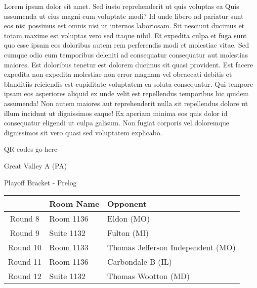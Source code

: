 \documentclass{article}%
\begin{document}
\vspace*{8pt}%
\linebreak%
\newline%
\newline%
Lorem ipsum dolor sit amet. Sed iusto reprehenderit ut quis voluptas ea Quis assumenda ut eius magni eum voluptate modi? Id unde libero ad pariatur sunt eos nisi possimus est omnis nisi ut internos laboriosam. Sit nesciunt ducimus et totam maxime est voluptas vero sed itaque nihil. Et expedita culpa et fuga sunt quo esse ipsam eos doloribus autem rem perferendis modi et molestiae vitae.\newline%
\newline%
Sed cumque odio eum temporibus deleniti ad consequatur consequatur aut molestias maiores. Est doloribus tenetur est dolorem ducimus sit quasi provident. Est facere expedita non expedita molestiae non error magnam vel obcaecati debitis et blanditiis reiciendis est cupiditate voluptatem ea soluta consequatur. Qui tempore ipsam eos asperiores aliquid ex unde velit est repellendus temporibus hic quidem assumenda!\newline%
\newline%
Non autem maiores aut reprehenderit nulla sit repellendus dolore ut illum incidunt ut dignissimos eaque! Ex aperiam minima eos quis dolor id consequatur eligendi ut culpa galisum. Non fugiat corporis vel doloremque dignissimos sit vero quasi sed voluptatem explicabo.\newline%
\newline%
%
\vspace*{30pt}%
\begin{center}%
\begin{Huge}%
QR codes go here%
\end{Huge}%
\end{center}%
\newpage%
\begin{center}%
\begin{Huge}%
Great Valley A (PA)%
\end{Huge}%
\vspace*{8pt}%
\linebreak%
\begin{Large}%
Playoff Bracket {-} Prelog%
\end{Large}%
\end{center}%
%
\begin{tabularx}{\textwidth}{|c|Y|Y|}%
\hline%
&Room Name&Opponent\\%
\hline%
Round 8&Room 1136&Eldon (MO)\\%
Round 9&Suite 1132&Fulton (MI)\\%
Round 10&Room 1133&Thomas Jefferson Independent (MO)\\%
Round 11&Room 1136&Carbondale B (IL)\\%
Round 12&Suite 1132&Thomas Wootton (MD)\\%
\hline%
\end{tabularx}%
\end{document}
